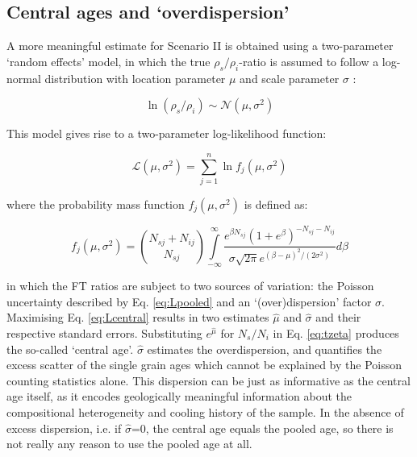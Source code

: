 \documentclass{article}
\begin{document}
\subsection{Central ages and `overdispersion'}
\label{sec:randomeffects}

A more meaningful estimate for Scenario II is obtained using a
two-parameter `random effects' model, in which the true
$\rho_s/\rho_i$-ratio is assumed to follow a log-normal distribution
with location parameter $\mu$ and scale parameter $\sigma$
\citep{galbraith1993}:

\begin{equation}
\ln (\rho_s/\rho_i) \sim \mathcal{N}(\mu,\sigma^2)
\label{eq:logrhosrhoi}
\end{equation}

This model gives rise to a two-parameter log-likelihood function:

\begin{equation}
  \mathcal{L}(\mu,\sigma^2) = \sum\limits_{j=1}^{n}
  \ln f_j(\mu,\sigma^2)
\label{eq:Lcentral}
\end{equation}

where the probability mass function $f_j(\mu,\sigma^2)$ is defined as:

\begin{equation}
  f_j(\mu,\sigma^2) = {{N_{sj}+N_{ij}}\choose{N_{sj}}}
  \int\limits_{-\infty}^{\infty} \frac{e^{\beta N_{sj}} \left( 1 +
    e^\beta \right)^{-N_{sj}-N_{ij}}} {\sigma\sqrt{2\pi}
    e^{(\beta-\mu)^2/(2\sigma^2)}} d\beta
  \label{eq:fjms}
\end{equation}

in which the FT ratios are subject to two sources of variation: the
Poisson uncertainty described by Eq.  \ref{eq:Lpooled} and an
`(over)dispersion' factor $\sigma$.  Maximising Eq. \ref{eq:Lcentral}
results in two estimates $\hat{\mu}$ and $\hat{\sigma}$ and their
respective standard errors.  Substituting $e^{\hat{\mu}}$ for
$N_s/N_i$ in Eq. \ref{eq:tzeta} produces the so-called `central
age'. $\hat{\sigma}$ estimates the overdispersion, and quantifies the
excess scatter of the single grain ages which cannot be explained by
the Poisson counting statistics alone. This dispersion can be just as
informative as the central age itself, as it encodes geologically
meaningful information about the compositional heterogeneity and
cooling history of the sample.  In the absence of excess dispersion,
i.e. if $\hat{\sigma}$=0, the central age equals the pooled age, so
there is not really any reason to use the pooled age at all.
\end{document}

